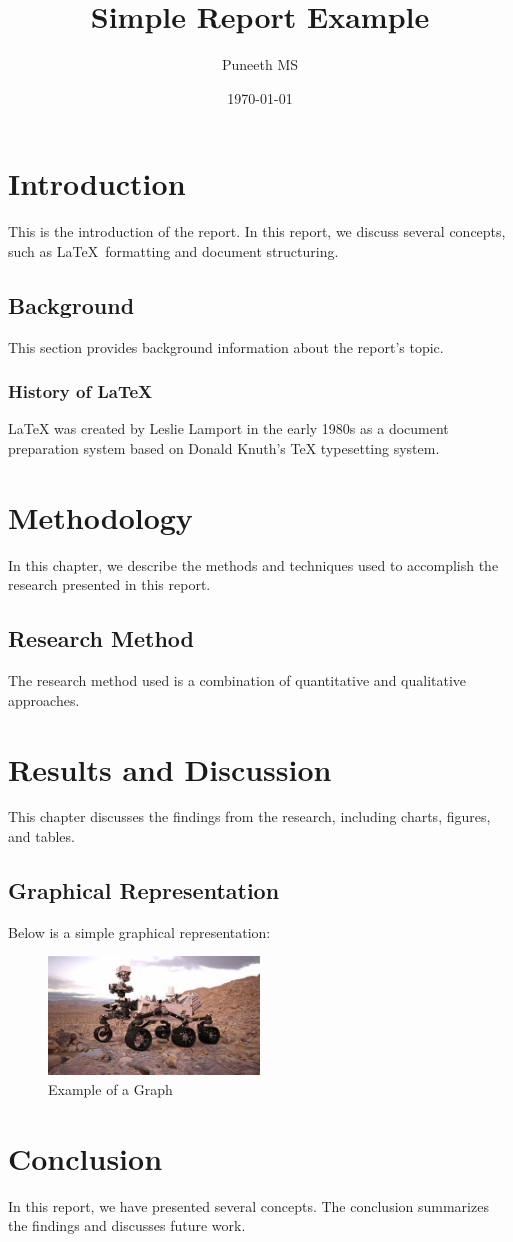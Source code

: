 \documentclass[a4paper, 12pt]{report}
\title{Simple Report Example}
\author{Puneeth MS}
\date{\today}
\begin{document}
\maketitle 

\tableofcontents 

\chapter{Introduction} 
This is the introduction of the report. In this report, we discuss several concepts, such as \LaTeX\ formatting and document structuring.

\section{Background} 
This section provides background information about the report's topic.

\subsection{History of LaTeX} 
LaTeX was created by Leslie Lamport in the early 1980s as a document preparation system based on Donald Knuth's TeX typesetting system.

\chapter{Methodology} 
In this chapter, we describe the methods and techniques used to accomplish the research presented in this report.

\section{Research Method} 
The research method used is a combination of quantitative and qualitative approaches.

\chapter{Results and Discussion} 
This chapter discusses the findings from the research, including charts, figures, and tables.

\section{Graphical Representation} 
Below is a simple graphical representation:

\begin{figure}[h] 
\centering
\includegraphics[width=0.5\textwidth]{puneeth1.jpg} 
\caption{Example of a Graph}
\end{figure}

\chapter{Conclusion} 
In this report, we have presented several concepts. The conclusion summarizes the findings and discusses future work.
\end{document}
